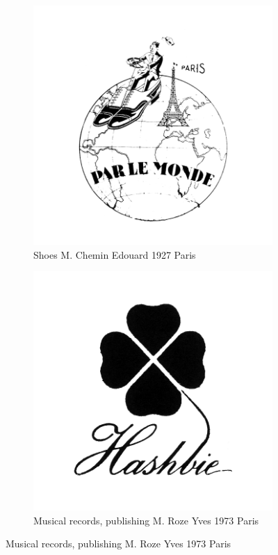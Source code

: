 \begin{figure}[h]
  \begin{subfigure}{.45\textwidth}
    \centering
    \includegraphics[width=.5\linewidth]{images/supplement/trademarks/french/8_34}
    \caption[]{Shoes M. Chemin Edouard 1927 Paris}
    \label{fig:trademarks:french:8.34}
  \end{subfigure}\hfill
  \begin{subfigure}{.45\textwidth}
    \centering
    \includegraphics[width=.5\linewidth]{images/supplement/trademarks/french/9_14}
    \caption[]{Musical records, publishing M. Roze Yves 1973 Paris}
    \label{fig:trademarks:french:9.14}
  \end{subfigure}


\end{figure}
